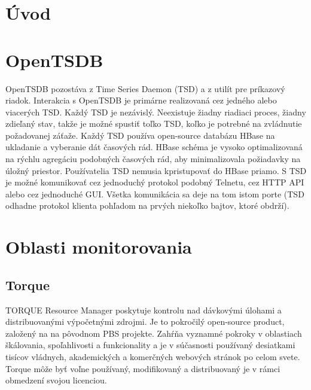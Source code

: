 \documentclass[11pt,final,oneside]{fithesis}
\begin{document}
\FrontMatter
\ThesisTitlePage

\begin{ThesisDeclaration}
\DeclarationText
\AdvisorName
\end{ThesisDeclaration}


\begin{ThesisThanks}
\end{ThesisThanks}

\begin{ThesisAbstract}
\end{ThesisAbstract}

\begin{ThesisKeyWords}
\end{ThesisKeyWords}

\tableofcontents
{}

\MainMatter
\chapter{Úvod}

\chapter{OpenTSDB}
OpenTSDB pozostáva z Time Series Daemon (TSD) a z utilít pre príkazový riadok. Interakcia s OpenTSDB je primárne realizovaná cez jedného alebo viacerých TSD. Každý TSD je nezávislý.
Neexistuje žiadny riadiaci proces, žiadny zdieľaný stav, takže je možné spustiť toľko TSD, koľko je potrebné na zvládnutie požadovanej záťaže. Každý TSD používa open-source databázu HBase
na ukladanie a vyberanie dát časových rád. HBase schéma je vysoko optimalizovaná na rýchlu agregáciu podobných časových rád, aby minimalizovala požiadavky na úložný priestor. 
Používatelia TSD nemusia kpristupovať do HBase priamo. S TSD je možné komunikovať cez jednoduchý protokol podobný Telnetu, cez HTTP API alebo cez jednoduché GUI. Všetka komunikácia
sa deje na tom istom porte (TSD odhadne protokol klienta pohľadom na prvých niekoľko bajtov, ktoré obdrží).\cite{openTSDB}


\chapter{Oblasti monitorovania}
\section{Torque}
TORQUE Resource Manager poskytuje kontrolu nad dávkovými úlohami a distribuovanými výpočetnými zdrojmi. Je to pokročilý open-source product, založený na na pôvodnom PBS projekte. 
Zahŕňa vyznamné pokroky v oblastiach škálovania, spoľahlivosti a funkcionality a je v súčasnosti používaný desiatkami tisícov vládnych, akademických a komerčných webových stránok po celom svete. Torque môže byť voľne používaný, modifikovaný a distribuovaný je v rámci obmedzení svojou licenciou.\cite{torque}
\end{document}
